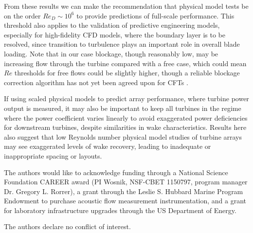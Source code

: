 \documentclass[energies,article,accept,moreauthors,pdftex,12pt,a4paper]{mdpi}
\begin{document}
From these results we can make the recommendation that physical model tests be
on the order $Re_D \sim 10^6$ to provide predictions of full-scale performance.
This threshold also applies to the validation of predictive engineering models,
especially for high-fidelity CFD models, where the boundary layer is to be
resolved, since transition to turbulence plays an important role in overall
blade loading. Note that in our case blockage, though reasonably low, may be
increasing flow through the turbine compared with a free case, which could mean
$Re$ thresholds for free flows could be slightly higher, though a reliable
blockage correction algorithm has not yet been agreed upon for CFTs
\cite{Cavagnaro2014}.

If using scaled physical models to predict array performance, where turbine
power output is measured, it may also be important to keep all turbines in the
regime where the power coefficient varies linearly to avoid exaggerated power
deficiencies for downstream turbines, despite similarities in wake
characteristics. Results here also suggest that low Reynolds number physical
model studies of turbine arrays may see exaggerated levels of wake recovery,
leading to inadequate or inappropriate spacing or layouts.



The authors would like to acknowledge funding through a National Science
Foundation CAREER award (PI Wosnik, NSF-CBET 1150797, program manager Dr.
Gregory L. Rorrer), a grant through the Leslie S. Hubbard Marine Program
Endowment to purchase acoustic flow measurement instrumentation, and a grant for
laboratory infrastructure upgrades through the US Department of Energy.


The authors declare no conflict of interest.




\end{document}
